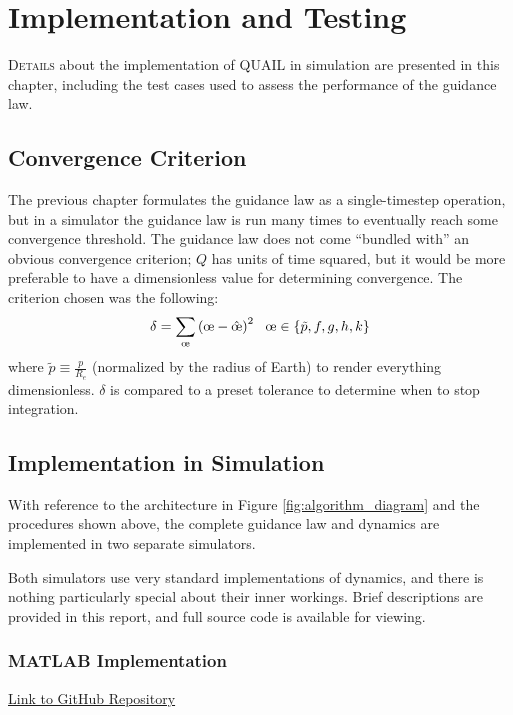 \chapter{Implementation and Testing}

\lettrine{D}{etails} about the implementation of QUAIL in simulation are presented in this chapter, including the test cases used to assess the performance of the guidance law.

\section{Convergence Criterion}
The previous chapter formulates the guidance law as a single-timestep operation, but in a simulator the guidance law is run many times to eventually reach some convergence threshold. The guidance law does not come ``bundled with'' an obvious convergence criterion; \(Q\) has units of time squared, but it would be more preferable to have a dimensionless value for determining convergence. The criterion chosen was the following:
\begin{equation*}
  \delta = \sum_\moe \left(\moe-\hat{\moe} \right)^2 \ \ \moe \in \{\tilde{p}, f, g, h, k\}
\end{equation*}
where \(\tilde{p} \equiv \frac{p}{R_e}\) (normalized by the radius of Earth) to render everything dimensionless. \(\delta\) is compared to a preset tolerance to determine when to stop integration.

\section{Implementation in Simulation}
With reference to the architecture in Figure \ref{fig:algorithm_diagram} and the procedures shown above, the complete guidance law and dynamics are implemented in two separate simulators.

Both simulators use very standard implementations of dynamics, and there is nothing particularly special about their inner workings. Brief descriptions are provided in this report, and full source code is available for viewing.

\subsection{MATLAB Implementation}
\href{https://github.com/itchono/SLyGA}{Link to GitHub Repository}

